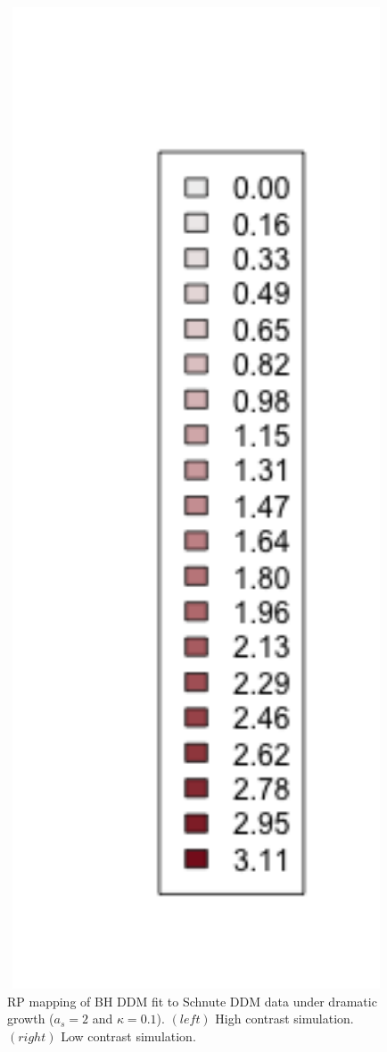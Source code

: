 \begin{figure}[h!]
\begin{minipage}[h!]{0.09\textwidth}
\includegraphics[width=1.5\textwidth]{../gpBias/legendSubSchnute.png}
\end{minipage}
\caption{
RP mapping of BH DDM fit to Schnute DDM data under dramatic growth ($a_s=2$ and $\kappa=0.1$).
$(left)$ High contrast simulation.
$(right)$ Low contrast simulation.
}\label{dramaticGrowth}
\end{figure}
